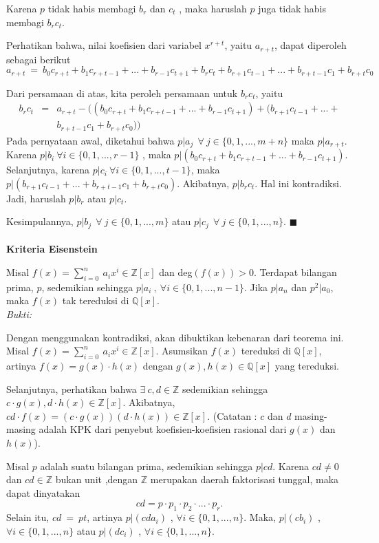 \par 	Karena $p$ tidak habis membagi $b_r$ dan $c_t$ , maka haruslah $p$ juga tidak habis membagi $b_rc_t$.
\par 	Perhatikan bahwa, nilai koefisien dari variabel $x^{r+t}$, yaitu $a_{r+t}$, dapat diperoleh sebagai berikut
	$$ a_{r+t}~=~b_0c_{r+t}+b_1c_{r+t-1}+...+b_{r-1}c_{t+1}+b_rc_t+b_{r+1}c_{t-1}+...+b_{r+t-1}c_1+b_{r+t}c_0$$
\par 	Dari persamaan di atas, kita peroleh persamaan untuk $b_rc_t$, yaitu
	$$\begin{array}{rcl}
	 b_rc_t&=&a_{r+t} - ((b_0c_{r+t}+b_1c_{r+t-1}+...+b_{r-1}c_{t+1})+(b_{r+1}c_{t-1}+...+\\
	&& b_{r+t-1}c_1+b_{r+t}c_0))
	\end{array}$$
	Pada pernyataan awal, diketahui bahwa $p |a_j~~\forall~j\in \{0,1,...,m+n\}$ maka $p|a_{r+t}$. Karena $p|b_i~\forall i\in \{0,1,...,r-1\}$ , maka $p|(b_0c_{r+t}+b_1c_{r+t-1}+...+b_{r-1}c_{t+1})$. Selanjutnya, karena $p|c_i~\forall i\in 						\{0,1,...,t-1\}$, maka $p|(b_{r+1}c_{t-1}+...+b_{r+t-1}c_1+b_{r+t}c_0)$. Akibatnya, $p|b_rc_t$. Hal ini kontradiksi. Jadi, haruslah $p|b_r$ atau $p|c_t$.
\par 	Kesimpulannya, $p |b_j~~\forall~j\in\{0,1,...,m\}$ atau $p |c_j~~\forall~j\in \{0,1,...,n\}$. $\blacksquare$
	\\
	\\
	\textbf{Kriteria Eisenstein}
\par 	Misal $f(x)= \sum^{n}_{i=0} \ a_ix^i \in \mathbb{Z}[x]$  dan deg$(f(x)) >0$. Terdapat bilangan prima, $p$, sedemikian sehingga $p|a_i~,~\forall i \in \{0,1,...,n-1\}$. Jika $p|a_n$ dan $p^2|a_0$,  maka $f(x)$ tak tereduksi di $\mathbb{Q}[x]$.
	\\
	\textit{Bukti:}
\par 	Dengan menggunakan kontradiksi, akan dibuktikan kebenaran dari teorema ini. Misal $f(x)= \sum^{n}_{i=0} \ a_ix^i \in \mathbb{Z}[x]$. Asumsikan $f(x)$ tereduksi di $\mathbb{Q}[x]$, artinya $f(x) = g(x) \cdot h(x)$ dengan $g(x), h(x) \in \mathbb{Q}[x]$ yang tereduksi. 
\par 	Selanjutnya, perhatikan bahwa $\exists~c,d \in \mathbb{Z}$ sedemikian sehingga $c\cdot g(x),d\cdot h(x) \in \mathbb{Z}[x]$. Akibatnya, $cd \cdot f(x) = (c\cdot g(x))(d\cdot h(x)) \in \mathbb {Z}[x]$. (Catatan : $c$ dan $d$ masing-masing adalah KPK dari penyebut 			koefisien-koefisien rasional dari $g(x)$ dan $h(x)$).
\par 	Misal $p$ adalah suatu bilangan prima, sedemikian sehingga $p|cd$. Karena $cd \ne 0$ dan $cd\in \mathbb{Z}$ bukan unit ,dengan $\mathbb{Z}$ merupakan daerah faktorisasi tunggal, maka dapat dinyatakan $$cd = p\cdot p_1\cdot p_2\cdot ... \cdot p_r.$$ Selain 		itu, $cd~=~pt$, artinya $p| (cda_i)$ , $\forall i \in \{0,1,...,n\}$. Maka,  $p| (cb_i)$ , $\forall i \in \{0,1,...,n\}$ atau  $p| (dc_i)$ , $\forall i \in \{0,1,...,n\}$. 
